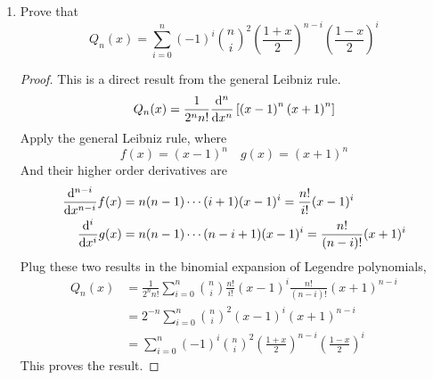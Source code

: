 \begin{enumerate}
\begin{proof}
\begin{align*}
	(n+1)Q_{n+1}(x)&=\frac{n+1}{2^{n}n!}x\D{n}{x}\left[\left(x^2-1\right)^{n}\right]+\frac{n+1}{2^{n}n!}\D{n-1}{x}\left[\left(x^2-1\right)^{n}\right]\\
	&=x(n+1)Q_n(x)+\frac{n(n+1)}{2^{n}n!}\D{n-1}{x}\left[\left(x^2-1\right)^{n}\right]\\
	&=x(2n+1)Q_n(x)-nxQ_n(x)-\frac{n}{2^n n!}x\D{n}{x}\left[\left(x^2-1\right)^{n}\right]
	\end{align*}
	The last term without its coefficient is already in (***), so
	\[ x\D{n}{x}\left[\left(x^2-1\right)^{n}\right]=\D{n}{x}\left[x\left(x^2-1\right)^{n}\right]-n\D{n-1}{x}\left[\left(x^2-1\right)^{n}\right] \]
	Apply substitution,
	\begin{align*}
	(n+1)Q_{n+1}(x)&=x(2n+1)Q_n(x)+\frac{n+1}{2^(n-1)!}\D{n-1}{x}\left[\left(x^2-1\right)^{n}\right]\\
	&-\frac{n}{2^n n!}\D{n}{x}\left[x\left(x^2-1\right)^{n}\right]+\frac{n}{2^n n!}\D{n-1}{x}\left[n\left(x^2-1\right)^{n}\right]\\
	&=x(2n+1)Q_n(x)+\frac{1}{2^n(n-1)!}\\
	&\cdot\D{n-1}{x}\left\{(n-1)\left(x^2-1\right)^{n}-\frac{\ud}{\ud x}\left[x\left(x^2-1\right)^{n}\right]+n\left(x^2-1\right)^{n} \right\}\\
	&=x(2n+1)Q_n(x)\\
	&+\frac{1}{2^n(n-1)!}\D{n-1}{x}\left[2n\left(x^2-1\right)\left(x^2-1\right)^{n-1}-2x^2n\left(x^2-1\right)^{n-1} \right]\\
	&=x(2n+1)Q_n(x)-\frac{2n}{2^n(n-1)!}\D{n-1}{x}\left[\left(x^2-1\right)^{n}\right]\\
	&=x(2n+1)Q_n(x)-nQ_{n-1}(x)
	\end{align*}
	This proves the recurrence relation of Legendre polynomials.
	\end{proof}
	\item Prove that
	\[ Q_n(x)=\sum_{i=0}^{n}(-1)^i \binom{n}{i}^2 \left(\frac{1+x}{2}\right)^{n-i} \left(\frac{1-x}{2}\right)^{i} \]
	\begin{proof}
	This is a direct result from the general Leibniz rule.
	\[ Q_n(x)=\frac{1}{2^nn!}\frac{\mathrm{d}^{n}}{\mathrm{d}{x}^{n}}\left[\left(x-1\right)^n\left(x+1\right)^n\right] \]
	Apply the general Leibniz rule, where
	\[ f(x)=(x-1)^n \quad g(x)=(x+1)^n \]
	And their higher order derivatives are
	\begin{align*}
	\frac{\mathrm{d}^{n-i}}{\mathrm{d}{x}^{n-i}}f(x)&=n(n-1)\cdots(i+1)(x-1)^i=\frac{n!}{i!}(x-1)^i\\
	\frac{\mathrm{d}^{i}}{\mathrm{d}{x}^{i}}g(x)&=n(n-1)\cdots(n-i+1)(x-1)^i=\frac{n!}{(n-i)!}(x+1)^i
	\end{align*}
	Plug these two results in the binomial expansion of Legendre polynomials,
	\begin{align*}
	Q_n(x)&=\frac{1}{2^nn!}\sum_{i=0}^{n}\binom{n}{i}\frac{n!}{i!}(x-1)^i\frac{n!}{(n-i)!}(x+1)^{n-i}\\
	&=2^{-n}\sum_{i=0}^{n}\binom{n}{i}^2(x-1)^i(x+1)^{n-i}\\
	&=\sum_{i=0}^{n}(-1)^i \binom{n}{i}^2 \left(\frac{1+x}{2}\right)^{n-i} \left(\frac{1-x}{2}\right)^{i}
	\end{align*}
	This proves the result.
	\end{proof}
\end{enumerate}


